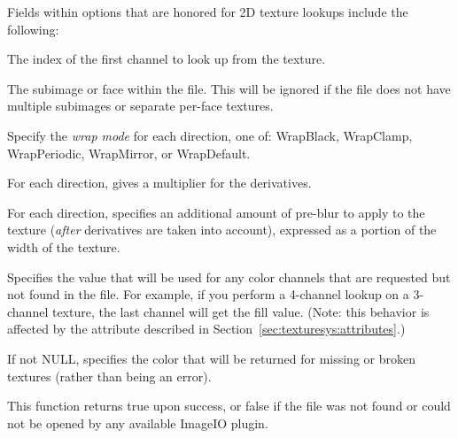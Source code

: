 Fields within {\cf options} that are honored for 2D texture lookups
include the following:

\vspace{-12pt}
\vspace{10pt}
The index of the first channel to look up from the texture.
\apiend

\vspace{-24pt}
\vspace{10pt}
The subimage or face within the file.
This will be ignored if the file does not have multiple subimages or
separate per-face textures.
\apiend

\vspace{-24pt}
\vspace{10pt}
Specify the \emph{wrap mode} for each direction, one of: 
{\cf WrapBlack}, {\cf WrapClamp}, {\cf WrapPeriodic}, {\cf WrapMirror},
or {\cf WrapDefault}.
\apiend

\vspace{-24pt}
\vspace{10pt}
For each direction, gives a multiplier for the derivatives.
\apiend

\vspace{-24pt}
\vspace{10pt}
For each direction, specifies an additional amount of pre-blur to apply
to the texture (\emph{after} derivatives are taken into account),
expressed as a portion of the width of the texture.
\apiend

\vspace{-24pt}
\vspace{10pt}
Specifies the value that will be used for any color channels that are
requested but not found in the file.  For example, if you perform a
4-channel lookup on a 3-channel texture, the last channel will
get the fill value.  (Note: this behavior is affected by the
 attribute described in 
Section~\ref{sec:texturesys:attributes}.)
\apiend

\vspace{-24pt}
\vspace{10pt}
If not NULL, specifies the color that will be returned for missing or
broken textures (rather than being an error).
\apiend

This function returns {\cf true} upon success, or {\cf false} if the
file was not found or could not be opened by any available ImageIO
plugin.
\apiend


